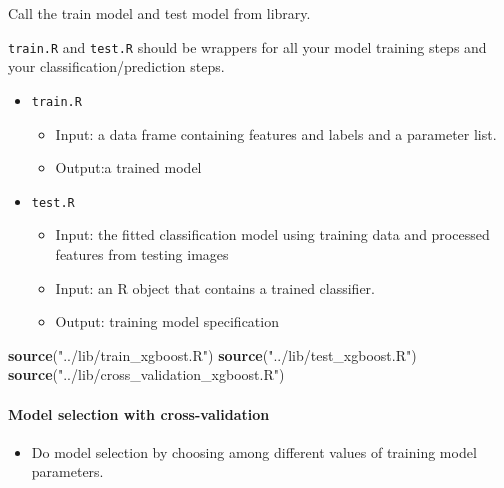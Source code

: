 \documentclass[
]{article}
\newenvironment{Shaded}{\begin{snugshade}}{\end{snugshade}}
\newcommand{\KeywordTok}[1]{\textcolor[rgb]{0.13,0.29,0.53}{\textbf{#1}}}
\newcommand{\NormalTok}[1]{#1}
\newcommand{\StringTok}[1]{\textcolor[rgb]{0.31,0.60,0.02}{#1}}
\providecommand{\tightlist}{%
  \setlength{\itemsep}{0pt}\setlength{\parskip}{0pt}}
\begin{document}
Call the train model and test model from library.

\texttt{train.R} and \texttt{test.R} should be wrappers for all your
model training steps and your classification/prediction steps.

\begin{itemize}
\tightlist
\item
  \texttt{train.R}

  \begin{itemize}
  \tightlist
  \item
    Input: a data frame containing features and labels and a parameter
    list.
  \item
    Output:a trained model
  \end{itemize}
\item
  \texttt{test.R}

  \begin{itemize}
  \tightlist
  \item
    Input: the fitted classification model using training data and
    processed features from testing images
  \item
    Input: an R object that contains a trained classifier.
  \item
    Output: training model specification
  \end{itemize}
\end{itemize}

\begin{Shaded}
\begin{Highlighting}[]
\KeywordTok{source}\NormalTok{(}\StringTok{"../lib/train_xgboost.R"}\NormalTok{) }
\KeywordTok{source}\NormalTok{(}\StringTok{"../lib/test_xgboost.R"}\NormalTok{) }
\KeywordTok{source}\NormalTok{(}\StringTok{"../lib/cross_validation_xgboost.R"}\NormalTok{) }
\end{Highlighting}
\end{Shaded}

\hypertarget{model-selection-with-cross-validation-1}{%
\paragraph{Model selection with
cross-validation}\label{model-selection-with-cross-validation-1}}

\begin{itemize}
\tightlist
\item
  Do model selection by choosing among different values of training
  model parameters.
\end{itemize}
\end{document}
